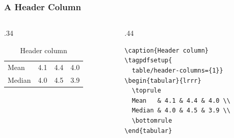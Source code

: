 \documentclass{ltx-talk}
\begin{document}
\begin{frame*}
  \frametitle{A Header Column}
  \begin{columns}
    \begin{column}{.34\textwidth}
      \begin{table}
        \caption{Header column}\label{tab:headercol}
        \begin{tabular}{lrrr}
          \toprule
          Mean   & 4.1 & 4.4 & 4.0 \\
          Median & 4.0 & 4.5 & 3.9 \\ \bottomrule
        \end{tabular}
      \end{table}
    \end{column}
    \begin{column}{.44\textwidth}
\small
\begin{verbatim}
\caption{Header column}
\tagpdfsetup{
  table/header-columns={1}}
\begin{tabular}{lrrr}
  \toprule
  Mean   & 4.1 & 4.4 & 4.0 \\
  Median & 4.0 & 4.5 & 3.9 \\
  \bottomrule
\end{tabular}
\end{verbatim}
    \end{column}
  \end{columns}
\end{frame*}
\end{document}
